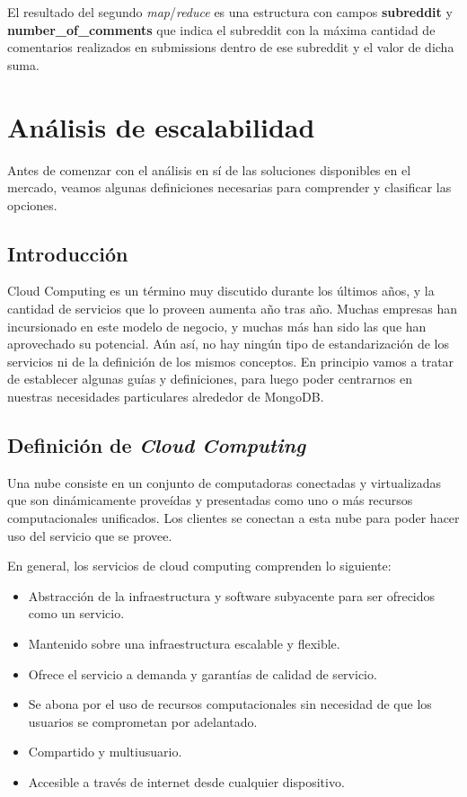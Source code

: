 \documentclass[a4paper,10pt,twoside]{article}
\newcommand{\map}{\emph{map}\xspace}
\newcommand{\reduce}{\emph{reduce}\xspace}
\begin{document}
El resultado del segundo \map/\reduce es una estructura con campos \textbf{subreddit} y \textbf{number\_of\_comments} que indica el subreddit con la máxima cantidad de comentarios realizados en submissions dentro de ese subreddit y el valor de dicha suma.




\section{Análisis de escalabilidad}

Antes de comenzar con el análisis en sí de las soluciones disponibles en el mercado, veamos algunas definiciones necesarias para comprender y clasificar las opciones.


\subsection{Introducción}

Cloud Computing es un término muy discutido durante los últimos años, y la cantidad de servicios que lo proveen aumenta año tras año. Muchas empresas han incursionado en este modelo de negocio, y muchas más han sido las que han aprovechado su potencial. Aún así, no hay ningún tipo de estandarización de los servicios ni de la definición de los mismos conceptos. En principio vamos a tratar de establecer algunas guías y definiciones, para luego poder centrarnos en nuestras necesidades particulares alrededor de MongoDB.


\subsection{Definición de \emph{Cloud Computing}}

Una nube consiste en un conjunto de computadoras conectadas y virtualizadas que son dinámicamente proveídas y presentadas como uno o más recursos computacionales unificados. Los clientes se conectan a esta nube para poder hacer uso del servicio que se provee.

En general, los servicios de cloud computing comprenden lo siguiente:

\begin{itemize}
	\item Abstracción de la infraestructura y software subyacente para ser ofrecidos como un servicio.
	\item Mantenido sobre una infraestructura escalable y flexible.
	\item Ofrece el servicio a demanda y garantías de calidad de servicio.
	\item Se abona por el uso de recursos computacionales sin necesidad de que los usuarios se comprometan por adelantado.
	\item Compartido y multiusuario.
	\item Accesible a través de internet desde cualquier dispositivo.
\end{itemize}
\end{document}
